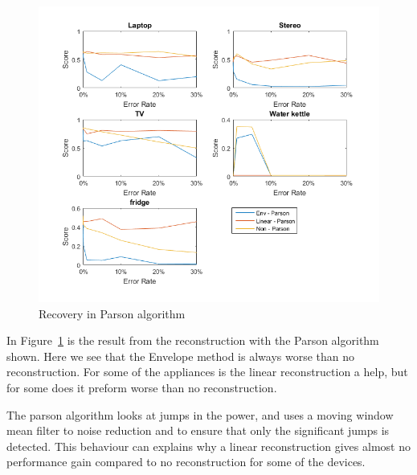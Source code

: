 \newpage

\begin{figure}[H]
\centering
\includegraphics[width=1\textwidth]{billeder/Rec-Parson.png}
\caption{Recovery in Parson algorithm}
\label{fig:ERPARSON}
\end{figure}

In Figure~\ref{fig:ERPARSON} is the result from the reconstruction with the Parson algorithm shown. Here we see that the Envelope method is always worse than no reconstruction. For some of the appliances is the linear reconstruction a help, but for some does it preform worse than no reconstruction. 

The parson algorithm looks at jumps in the power, and uses a moving window mean filter to noise reduction and to ensure that only the significant jumps is detected. This behaviour can explains why a linear reconstruction gives almost no performance gain compared to no reconstruction for some of the devices.
 
